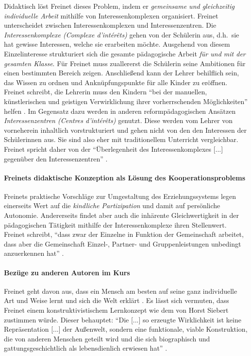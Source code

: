 Didaktisch löst Freinet dieses Problem, indem er \emph{gemeinsame und gleichzeitig individuelle Arbeit} mithilfe von Interessenkomplexen organisiert.
Freinet unterscheidet zwischen Interessenkomplexen und Interessenzentren.
Die \emph{Interessenkomplexe (Complexe d'intérêts)} gehen von der Schülerin aus, d.h.\ sie hat gewisse Interessen, welche sie erarbeiten möchte.
Ausgehend von diesem Einzelinteresse strukturiert sich die gesamte pädagogische Arbeit \emph{für und mit der gesamten Klasse}.
Für Freinet muss zuallererst die Schülerin seine Ambitionen für einen bestimmten Bereich zeigen.
Anschließend kann der Lehrer behilflich sein, das Wissen zu ordnen und Anknüpfungspunkte für alle Kinder zu eröffnen.
Freinet schreibt, die Lehrerin muss den Kindern ``bei der manuellen, künstlerischen und geistigen Verwirklichung ihrer vorherrschenden Möglichkeiten'' helfen \parencite[90]{Freinet1979}.
Im Gegensatz dazu werden in anderen reformpädagogischen Ansätzen \emph{Interessenzentren (Centres d'intérêts)} genutzt.
Diese werden vom Lehrer von vorneherein inhaltlich vorstrukturiert und gehen nicht von den den Interessen der Schülerinnen aus.
Sie sind also eher mit traditionellem Unterricht vergleichbar.
Freinet spricht daher von der ``Überlegenheit des Interessenkomplexes [...] gegenüber den Interessenzentren'' \parencite[89]{Freinet1979}.


\paragraph{Freinets didaktische Konzeption als Lösung des Kooperationsproblems}

Freinets praktische Vorschläge zur Umgestaltung des Erziehungssystems legen einerseits Wert auf die \emph{kindliche Partizipation} und damit auf persönliche Autonomie.
Andererseits findet aber auch die inhärente Gleichwertigkeit in der pädagogischen Tätigkeit mithilfe der Interessenkomplexe ihren Stellenwert.
Freinet schreibt, ``dass zwar der Einzelne in Funktion der Gemeinschaft arbeitet, dass aber die Gemeinschaft Einzel-, Partner- und Gruppenleistungen unbedingt anzuerkennen hat'' \parencite[87]{Freinet1979}.


\paragraph{Bezüge zu anderen Autoren im Kurs}

Freinet geht davon aus, dass ein Mensch am besten auf seine ganz individuelle Art und Weise lernt und sich die Welt erklärt \parencite[vgl.][96]{Freinet-2000a}.
Es lässt sich vermuten, dass Freinet einem konstruktivistischem Lernkonzept wie dem von Horst Siebert zustimmen würde.
Dieser behauptet: ``Die [...] so erzeugte Wirklichkeit ist keine Repräsentation [...] der Außenwelt, sondern eine funktionale, viable Konstruktion, die von anderen Menschen geteilt wird und die sich biographisch und gattungsgeschichtlich als lebensdienlich erwiesen hat'' \parencite[6]{siebert-2003}.

